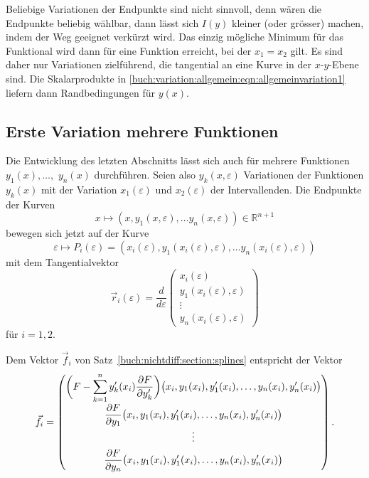 Beliebige Variationen der Endpunkte sind nicht sinnvoll, denn
wären die Endpunkte beliebig wählbar, dann lässt sich $I(y)$ kleiner
(oder grösser) machen, indem der Weg geeignet verkürzt wird.
Das einzig mögliche Minimum für das Funktional wird dann für eine
Funktion erreicht, bei der $x_1=x_2$ gilt.
Es sind daher nur Variationen zielführend, die tangential an eine
Kurve in der $x$-$y$-Ebene sind.
Die Skalarprodukte in 
\eqref{buch:variation:allgemein:eqn:allgemeinvariation1}
liefern dann Randbedingungen für $y(x)$.

%
%
\subsection{Erste Variation mehrere Funktionen
\label{buch:variation:allgemein:subsection:var1n}}
Die Entwicklung des letzten Abschnitts lässt sich auch für mehrere
Funktionen $y_1(x),\dots,$ $y_n(x)$ durchführen.
Seien also $y_k(x,\varepsilon)$ Variationen der Funktionen $y_k(x)$
mit der Variation $x_1(\varepsilon)$ und $x_2(\varepsilon)$ der 
Intervallenden.
Die Endpunkte der Kurven
\[
x
\mapsto
(x,
y_1(x,\varepsilon),\dots
y_n(x,\varepsilon))
\in \mathbb{R}^{n+1}
\]
bewegen sich jetzt auf der Kurve
\[
\varepsilon
\mapsto
P_i(\varepsilon)
=
(x_i(\varepsilon),
y_1(x_i(\varepsilon),\varepsilon),
\dots
y_n(x_i(\varepsilon),\varepsilon))
\]
mit dem Tangentialvektor
\[
\vec{r}_i(\varepsilon)
=
\frac{d}{d\varepsilon}
\begin{pmatrix}
x_i(\varepsilon)\\
y_1(x_i(\varepsilon),\varepsilon)\\
\vdots\\
y_n(x_i(\varepsilon),\varepsilon)
\end{pmatrix}
\]
für $i=1,2$.

Dem Vektor $\vec{f}_i$
von Satz~\ref{buch:nichtdiff:section:splines}
entspricht der Vektor
\[
\vec{f}_i
=
\renewcommand{\arraystretch}{1.8}
\begin{pmatrix}
\displaystyle
\biggl(
F%
-
\sum_{k=1}^n y'_k(x_i) \frac{\partial F}{\partial y_k'}
\biggr)
\bigl(x_i,y_1(x_i),y'_1(x_i),\dots,y_n(x_i),y_n'(x_i)\bigr)
\\
\displaystyle
\frac{\partial F}{\partial y_1}
\bigl(x_i,y_1(x_i),y'_1(x_i),\dots,y_n(x_i),y_n'(x_i)\bigr)
\\
\vdots
\\
\displaystyle
\frac{\partial F}{\partial y_n}
\bigl(x_i,y_1(x_i),y'_1(x_i),\dots,y_n(x_i),y_n'(x_i)\bigr)
\end{pmatrix}.
\]

